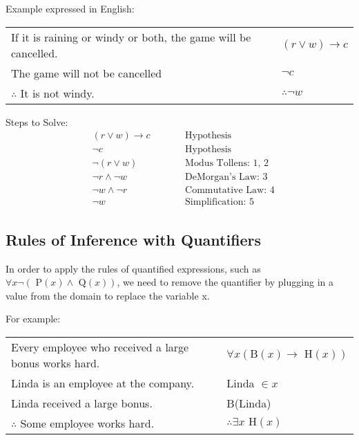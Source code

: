 \documentclass{article}
\begin{document}
Example expressed in English:
\begin{center}
  \begin{tabular}{lrl}
    If it is raining or windy or both, the game will be cancelled. &  & \((r \lor w) \rightarrow c\) \\
    The game will not be cancelled                                 &  & \(\lnot c\)                  \\
    \hhline{-~-}
    \(\therefore\) It is not windy.                                &  & \(\therefore \lnot w\)
  \end{tabular}

  Steps to Solve:
  \begin{align}
     & (r \lor w) \rightarrow c &  & \qquad \text{Hypothesis}          \\
     & \lnot c                  &  & \qquad \text{Hypothesis}          \\
     & \lnot (r \lor w)         &  & \qquad \text{Modus Tollens: 1, 2} \\
     & \lnot r \land \lnot w    &  & \qquad \text{DeMorgan's Law: 3}   \\
     & \lnot w \land \lnot r    &  & \qquad \text{Commutative Law: 4}  \\
     & \lnot w                  &  & \qquad \text{Simplification: 5}
  \end{align}
\end{center}

\subsection{Rules of Inference with Quantifiers}

In order to apply the rules of quantified expressions, such as \(\forall x \lnot (\text{ P}(x) \land \text{ Q}(x))\),
we need to remove the quantifier by plugging in a value from the domain to replace the variable x.

For example:
\begin{center}
  \begin{tabular}{lrl}
    Every employee who received a large bonus works hard. &  & \(\forall x (\text{B}(x) \rightarrow \text{ H}(x))\) \\
    Linda is an employee at the company.                  &  & Linda \(\in x\)                                      \\
    Linda received a large bonus.                         &  & B(Linda)                                             \\
    \hhline{-~-}
    \(\therefore\) Some employee works hard.              &  & \(\therefore \exists x \text{ H}(x)\)
  \end{tabular}
\end{center}
\end{document}
